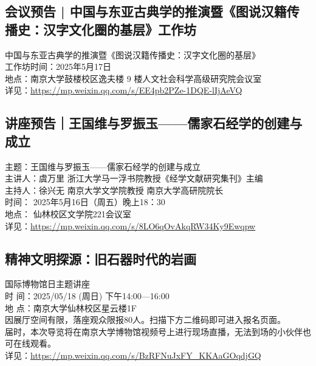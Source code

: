 \documentclass[letterpaper, 12pt]{article}
\begin{document}
\begin{multicols}{2}
\subsection{会议预告 | 中国与东亚古典学的推演暨《图说汉籍传播史：汉字文化圈的基层》工作坊} %
中国与东亚古典学的推演暨《图说汉籍传播史：汉字文化圈的基层》
\\工作坊时间：2025年5月17日
\\地点：南京大学鼓楼校区逸夫楼 9 楼人文社会科学高级研究院会议室
\\详见：\url{https://mp.weixin.qq.com/s/EE4pb2PZe-1DQE-lIjAeVQ}
\subsection{讲座预告｜王国维与罗振玉——儒家石经学的创建与成立} %
主题：王国维与罗振玉——儒家石经学的创建与成立
\\主讲人：虞万里 浙江大学马一浮书院教授《经学文献研究集刊》主编
\\主持人：徐兴无 南京大学文学院教授 南京大学高研院院长
\\时间：  2025年5月16日（周五）晚上18：30
\\地点：  仙林校区文学院221会议室
\\详见：\url{https://mp.weixin.qq.com/s/8LO6qOvAkqRW34Ky9Ewqpw}

\subsection{精神文明探源：旧石器时代的岩画} %
国际博物馆日主题讲座
\\时  间：2025/05/18 (周日)  下午14:00—16:00
\\地  点：南京大学仙林校区星云楼1F
\\因展厅空间有限，落座观众限报80人。扫描下方二维码即可进入报名页面。
\\届时，本次导览将在南京大学博物馆视频号上进行现场直播，无法到场的小伙伴也可在线观看。
\\详见：\url{https://mp.weixin.qq.com/s/BzRFNuJxFY_KKAaGOqdjGQ}


\end{multicols}
\end{document}

